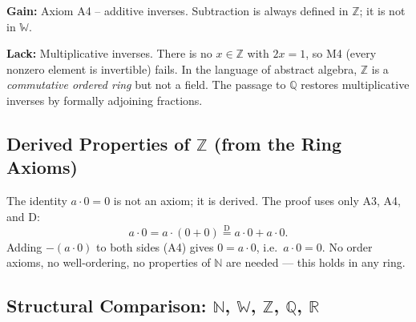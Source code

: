 \begin{remark*}
\textbf{Gain:} Axiom A4 -- additive inverses. Subtraction is always defined
in $\mathbb{Z}$; it is not in $\mathbb{W}$.

\textbf{Lack:} Multiplicative inverses. There is no $x \in \mathbb{Z}$
with $2x = 1$, so M4 (every nonzero element is invertible) fails.
In the language of abstract algebra, $\mathbb{Z}$ is a
\emph{commutative ordered ring} but not a field.
The passage to $\mathbb{Q}$ restores multiplicative inverses by formally
adjoining fractions.
\end{remark*}

\subsection*{Derived Properties of $\mathbb{Z}$ (from the Ring Axioms)}

\begin{remark*}
The identity $a \cdot 0 = 0$ is not an axiom; it is derived.
The proof uses only A3, A4, and D:
\[
a \cdot 0
= a \cdot (0 + 0)
\overset{\text{D}}{=} a \cdot 0 + a \cdot 0.
\]
Adding $-(a \cdot 0)$ to both sides (A4) gives $0 = a \cdot 0$, i.e.\ $a \cdot 0 = 0$.
No order axioms, no well-ordering, no properties of $\mathbb{N}$ are needed ---
this holds in any ring.
\end{remark*}

\subsection*{Structural Comparison: $\mathbb{N}$, $\mathbb{W}$, $\mathbb{Z}$, $\mathbb{Q}$, $\mathbb{R}$}

